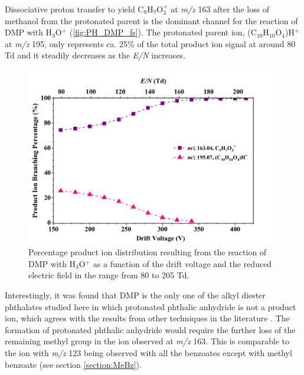 Dissociative proton transfer to yield C$_9$H$_{7}$O$_3^+$ at \textit{m/z} 163 after the loss of methanol from the protonated parent 
is the dominant channel for the reaction of DMP with H$_3$O$^+$ (\autoref{fig:PH_DMP_fs}).
The protonated parent ion, (C$_{10}$H$_{10}$O$_4$)H$^+$ at \textit{m/z} 195, only represents ca. 25\% of the total product ion signal at around 80 Td and it steadily decreases as the \textit{E/N} increases.
%
\begin{figure}[htb]%
\centering
\includegraphics[height=0.4\textheight]{pics/DMP-BR.png}
\caption{Percentage product ion distribution resulting from the reaction of DMP with H$_3$O$^+$ as a function of the drift voltage and the reduced electric field in the range from 80 to 205 Td.}
\label{fig:PH_DMP_fs}
\end{figure}
%
Interestingly, it was found that DMP is the only one of the alkyl diester phthalates studied here in which protonated phthalic anhydride is not a product ion, which agrees with the results from other techniques in the literature \cite{yin2014mass}.
%
The formation of protonated phthalic anhydride would require the further loss of the remaining methyl group in the ion observed at \textit{m/z} 163.
%
This is comparable to the ion with \textit{m/z} 123 being observed with all the benzoates except with methyl benzoate (see section \ref{section:MeBz}). 








